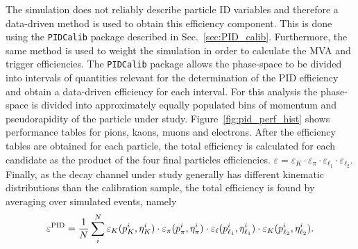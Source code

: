 The simulation does not reliably describe particle ID variables
and therefore a data-driven method is used to obtain this efficiency component.
This is done using the \verb!PIDCalib! package described in Sec.~\ref{sec:PID_calib}.
Furthermore, the same method is used to weight the simulation in order to calculate the MVA and trigger efficiencies.
The \verb!PIDCalib! package allows the phase-space to be divided into intervals of quantities relevant for the determination 
of the PID efficiency and obtain a data-driven efficiency for each interval. For this analysis the phase-space
is divided into approximately equally populated bins of momentum and pseudorapidity of the particle under study.
Figure~\ref{fig:pid_perf_hist} shows performance tables for pions, kaons, muons and electrons.
After the efficiency tables are obtained for each particle, the total efficiency
is calculated for each candidate as the product of the four final particles efficiencies.
$\varepsilon = \varepsilon_K\cdot\varepsilon_\pi\cdot\varepsilon_{\ell_1}\cdot\varepsilon_{\ell_2}$.
Finally, as the decay channel under study generally has different kinematic distributions than the calibration sample,
the total efficiency is found by averaging over simulated events, namely
%
\begin{equation}
\varepsilon^{\rm PID} = \frac{1}{N} \sum_i^N \varepsilon_K(p_K^i,\eta_K^i) \cdot \varepsilon_\pi(p_\pi^i,\eta_\pi^i) \cdot \varepsilon_\ell(p_{\ell_1}^i,\eta_{\ell_1}^i) \cdot \varepsilon_K(p_{\ell_2}^i,\eta_{\ell_2}^i).
\end{equation}
%

